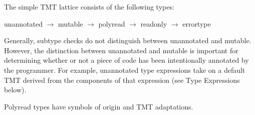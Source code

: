 The simple TMT lattice consists of the following types:

\begin{center}
	unannotated $\rightarrow$ mutable $\rightarrow$ polyread $\rightarrow$ readonly $\rightarrow$ errortype
\end{center}

Generally, subtype checks do not distinguish between unannotated and mutable. However, the distinction between unannotated
and mutable is important for determining whether or not a piece of code has been intentionally annotated by
the programmer. For example, unannotated type expressions take on a default TMT derived from the components of that
expression (see Type Expressions below).

Polyread types have symbols of origin and TMT adaptations. 
